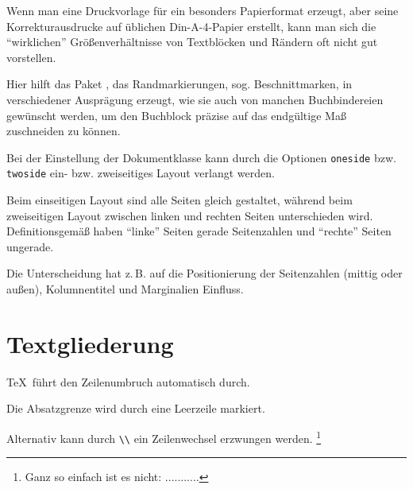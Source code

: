 
Wenn man eine Druckvorlage für ein besonders Papierformat erzeugt, aber seine Korrekturausdrucke
auf üblichen Din-A-4-Papier erstellt, kann man sich die \enquote{wirklichen} Größenverhältnisse von
Textblöcken und Rändern oft nicht gut vorstellen.

Hier hilft das Paket , das Randmarkierungen, sog. Beschnittmarken, in verschiedener
Ausprägung erzeugt, wie sie auch von manchen Buchbindereien gewünscht werden, um den Buchblock
präzise auf das endgültige Maß zuschneiden zu können.



Bei der Einstellung der Dokumentklasse kann durch die Optionen \lstinline/oneside/ bzw.
\lstinline/twoside/ ein- bzw. zweiseitiges Layout verlangt werden.

Beim einseitigen Layout sind alle Seiten gleich gestaltet, während beim zweiseitigen Layout zwischen
linken und rechten Seiten unterschieden wird. Definitionsgemäß haben \enquote{linke} Seiten gerade
Seitenzahlen und \enquote{rechte} Seiten ungerade.

Die Unterscheidung hat z.\,B. auf die Positionierung der Seitenzahlen (mittig oder außen), 
Kolumnentitel und Marginalien Einfluss.


\section{Textgliederung}


\TeX\ führt den Zeilenumbruch automatisch durch.

Die Absatzgrenze wird durch eine Leerzeile markiert. 

Alternativ kann durch \lstinline/\\/ ein Zeilenwechsel erzwungen werden.%
\footnote{Ganz so einfach ist es nicht: ...........}



